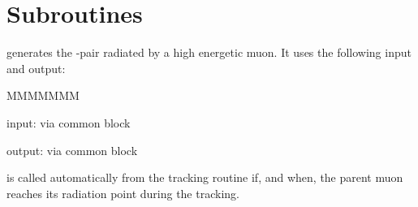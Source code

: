    
\section{Subroutines}
 generates the \Pep\Pem-pair radiated by a high energetic muon.
It uses the following input and output:
\begin{DLtt}{MMMMMMM}
\item[input:]  via common block 
\item[output:] via common block 
\end{DLtt}
 is called automatically from the tracking routine
 if, and when,
the parent muon reaches its radiation point during the tracking.
